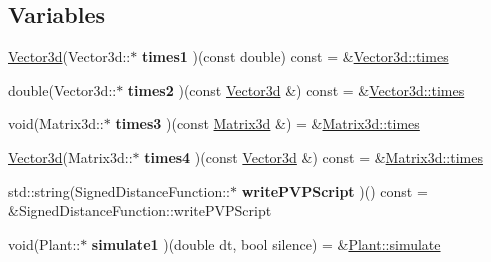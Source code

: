 \subsection*{Variables}
\begin{DoxyCompactItemize}
\item 
\mbox{\label{namespaceCPlantBox_acb3b098c7f82cedc9c3c6fbab2e7148a}} 
\hyperlink{classCPlantBox_1_1Vector3d}{Vector3d}(Vector3d\+::$\ast$ {\bfseries times1} )(const double) const = \&\hyperlink{classCPlantBox_1_1Vector3d_a4cd110acdf8a85fb3aca4d7916f67d3f}{Vector3d\+::times}
\item 
\mbox{\label{namespaceCPlantBox_a2e10f4711f6686c3c0f8a12a06d4a62c}} 
double(Vector3d\+::$\ast$ {\bfseries times2} )(const \hyperlink{classCPlantBox_1_1Vector3d}{Vector3d} \&) const = \&\hyperlink{classCPlantBox_1_1Vector3d_a4cd110acdf8a85fb3aca4d7916f67d3f}{Vector3d\+::times}
\item 
\mbox{\label{namespaceCPlantBox_a6e8b24b2eb01fe02efcc7867082d5e65}} 
void(Matrix3d\+::$\ast$ {\bfseries times3} )(const \hyperlink{classCPlantBox_1_1Matrix3d}{Matrix3d} \&) = \&\hyperlink{classCPlantBox_1_1Matrix3d_aff198f7d945f7b429932678e21b5b62b}{Matrix3d\+::times}
\item 
\mbox{\label{namespaceCPlantBox_a75828b23d463e1aeca93395cfc0d77b5}} 
\hyperlink{classCPlantBox_1_1Vector3d}{Vector3d}(Matrix3d\+::$\ast$ {\bfseries times4} )(const \hyperlink{classCPlantBox_1_1Vector3d}{Vector3d} \&) const = \&\hyperlink{classCPlantBox_1_1Matrix3d_aff198f7d945f7b429932678e21b5b62b}{Matrix3d\+::times}
\item 
\mbox{\label{namespaceCPlantBox_a940c7b14d2758157ca5e3acfe3f6fc23}} 
std\+::string(Signed\+Distance\+Function\+::$\ast$ {\bfseries write\+P\+V\+P\+Script} )() const = \&Signed\+Distance\+Function\+::write\+P\+V\+P\+Script
\item 
\mbox{\label{namespaceCPlantBox_a188619e1c73389c13fe56d08faf05e91}} 
void(Plant\+::$\ast$ {\bfseries simulate1} )(double dt, bool silence) = \&\hyperlink{classCPlantBox_1_1Plant_a47d8afff8e281a1760fa4b8046cc4378}{Plant\+::simulate}
\item 
\mbox{\label{namespaceCPlantBox_ac8f8a32ccc161763afe5eb07ccd5aa04}} 

\end{DoxyCompactItemize}

